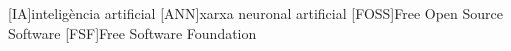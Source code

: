 [IA]{{inteligència artificial}}
[ANN]{{xarxa neuronal artificial}}
[FOSS]{Free Open Source Software}
[FSF]{Free Software Foundation}
